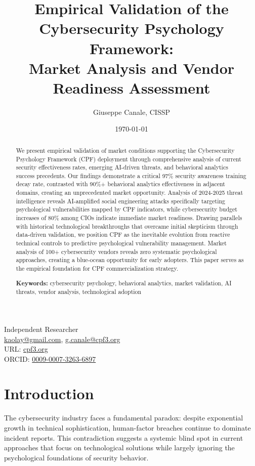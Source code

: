 \documentclass[11pt,a4paper]{article}
\title{Empirical Validation of the Cybersecurity Psychology Framework:\\Market Analysis and Vendor Readiness Assessment}
\author{Giuseppe Canale, CISSP}
\date{\today}
\begin{document}
\maketitle

\begin{center}
Independent Researcher\\
\href{mailto:kaolay@gmail.com}{kaolay@gmail.com}, 
\href{mailto:g.canale@cpf3.org}{g.canale@cpf3.org}\\
URL: \href{https://cpf3.org}{cpf3.org}\\
ORCID: \href{https://orcid.org/0009-0007-3263-6897}{0009-0007-3263-6897}
\end{center}

\begin{abstract}
We present empirical validation of market conditions supporting the Cybersecurity Psychology Framework (CPF) deployment through comprehensive analysis of current security effectiveness rates, emerging AI-driven threats, and behavioral analytics success precedents. Our findings demonstrate a critical 97\% security awareness training decay rate, contrasted with 90\%+ behavioral analytics effectiveness in adjacent domains, creating an unprecedented market opportunity. Analysis of 2024-2025 threat intelligence reveals AI-amplified social engineering attacks specifically targeting psychological vulnerabilities mapped by CPF indicators, while cybersecurity budget increases of 80\% among CIOs indicate immediate market readiness. Drawing parallels with historical technological breakthroughs that overcame initial skepticism through data-driven validation, we position CPF as the inevitable evolution from reactive technical controls to predictive psychological vulnerability management. Market analysis of 100+ cybersecurity vendors reveals zero systematic psychological approaches, creating a blue-ocean opportunity for early adopters. This paper serves as the empirical foundation for CPF commercialization strategy.

\textbf{Keywords:} cybersecurity psychology, behavioral analytics, market validation, AI threats, vendor analysis, technological adoption
\end{abstract}

\section{Introduction}

The cybersecurity industry faces a fundamental paradox: despite exponential growth in technical sophistication, human-factor breaches continue to dominate incident reports. This contradiction suggests a systemic blind spot in current approaches that focus on technological solutions while largely ignoring the psychological foundations of security behavior.
\end{document}
